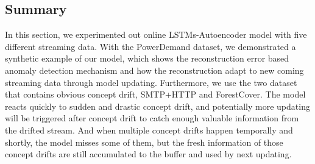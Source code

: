 \subsection{Summary}
\label{sec:summary}

In this section, we experimented out online LSTMs-Autoencoder model with five different streaming data. With the PowerDemand dataset, we demonstrated a synthetic example of our model, which shows the reconstruction error based anomaly detection mechanism and how the reconstruction adapt to new coming streaming data through model updating. Furthermore, we use the two dataset that contains obvious concept drift, SMTP+HTTP and ForestCover. The model reacts quickly to sudden and drastic concept drift, and potentially more updating will be triggered after concept drift to catch enough valuable information from the drifted stream. And when multiple concept drifts happen temporally and shortly, the model misses some of them, but the fresh information of those concept drifts are still accumulated to the buffer and used by next updating.







